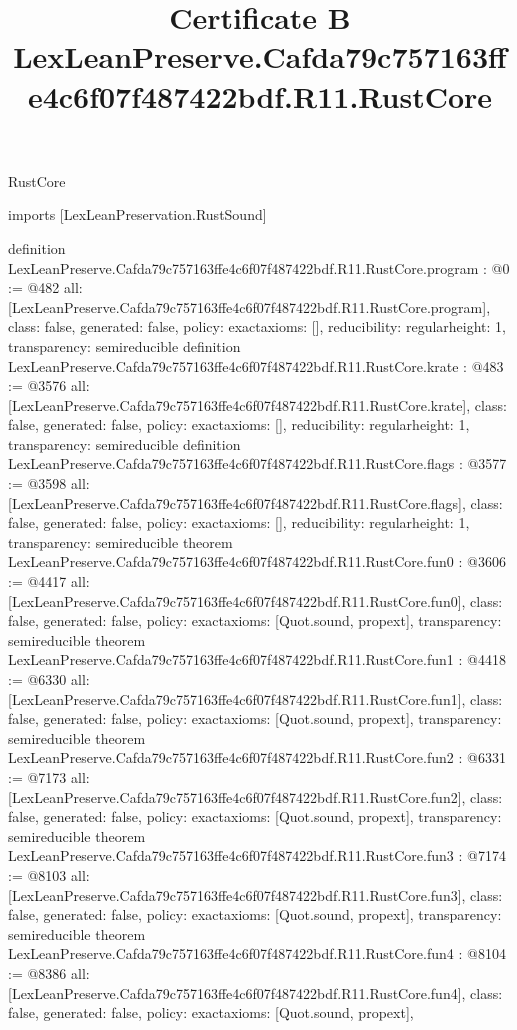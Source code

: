 \begin{lexlean}{RustCore}
\title{Certificate B LexLeanPreserve.Cafda79c757163ffe4c6f07f487422bdf.R11.RustCore}
\begin{coremodule}
imports [LexLeanPreservation.RustSound]

definition LexLeanPreserve.Cafda79c757163ffe4c6f07f487422bdf.R11.RustCore.program : @0 := @482 {
  all: [LexLeanPreserve.Cafda79c757163ffe4c6f07f487422bdf.R11.RustCore.program],
  class: false,
  generated: false,
  policy: exact{axioms: []},
  reducibility: regular{height: 1},
  transparency: semireducible
}
definition LexLeanPreserve.Cafda79c757163ffe4c6f07f487422bdf.R11.RustCore.krate : @483 := @3576 {
  all: [LexLeanPreserve.Cafda79c757163ffe4c6f07f487422bdf.R11.RustCore.krate],
  class: false,
  generated: false,
  policy: exact{axioms: []},
  reducibility: regular{height: 1},
  transparency: semireducible
}
definition LexLeanPreserve.Cafda79c757163ffe4c6f07f487422bdf.R11.RustCore.flags : @3577 := @3598 {
  all: [LexLeanPreserve.Cafda79c757163ffe4c6f07f487422bdf.R11.RustCore.flags],
  class: false,
  generated: false,
  policy: exact{axioms: []},
  reducibility: regular{height: 1},
  transparency: semireducible
}
theorem LexLeanPreserve.Cafda79c757163ffe4c6f07f487422bdf.R11.RustCore.fun0 : @3606 := @4417 {
  all: [LexLeanPreserve.Cafda79c757163ffe4c6f07f487422bdf.R11.RustCore.fun0],
  class: false,
  generated: false,
  policy: exact{axioms: [Quot.sound, propext]},
  transparency: semireducible
}
theorem LexLeanPreserve.Cafda79c757163ffe4c6f07f487422bdf.R11.RustCore.fun1 : @4418 := @6330 {
  all: [LexLeanPreserve.Cafda79c757163ffe4c6f07f487422bdf.R11.RustCore.fun1],
  class: false,
  generated: false,
  policy: exact{axioms: [Quot.sound, propext]},
  transparency: semireducible
}
theorem LexLeanPreserve.Cafda79c757163ffe4c6f07f487422bdf.R11.RustCore.fun2 : @6331 := @7173 {
  all: [LexLeanPreserve.Cafda79c757163ffe4c6f07f487422bdf.R11.RustCore.fun2],
  class: false,
  generated: false,
  policy: exact{axioms: [Quot.sound, propext]},
  transparency: semireducible
}
theorem LexLeanPreserve.Cafda79c757163ffe4c6f07f487422bdf.R11.RustCore.fun3 : @7174 := @8103 {
  all: [LexLeanPreserve.Cafda79c757163ffe4c6f07f487422bdf.R11.RustCore.fun3],
  class: false,
  generated: false,
  policy: exact{axioms: [Quot.sound, propext]},
  transparency: semireducible
}
theorem LexLeanPreserve.Cafda79c757163ffe4c6f07f487422bdf.R11.RustCore.fun4 : @8104 := @8386 {
  all: [LexLeanPreserve.Cafda79c757163ffe4c6f07f487422bdf.R11.RustCore.fun4],
  class: false,
  generated: false,
  policy: exact{axioms: [Quot.sound, propext]},
}
\end{coremodule}
\end{lexlean}
